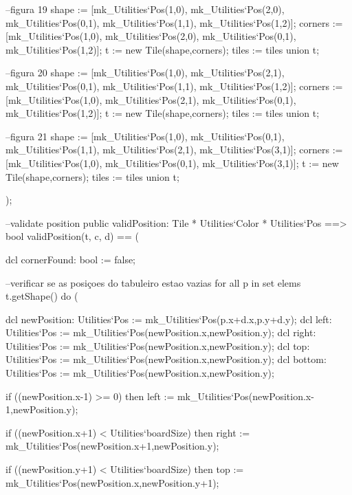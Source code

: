 \begin{vdm_al}
          --figura 19
          shape := [mk_Utilities`Pos(1,0), mk_Utilities`Pos(2,0), mk_Utilities`Pos(0,1),
       mk_Utilities`Pos(1,1), mk_Utilities`Pos(1,2)];
          corners := [mk_Utilities`Pos(1,0), mk_Utilities`Pos(2,0), mk_Utilities`Pos(0,1),
       mk_Utilities`Pos(1,2)];
          t := new Tile(shape,corners); 
          tiles := tiles union {t};
          
          --figura 20
          shape := [mk_Utilities`Pos(1,0), mk_Utilities`Pos(2,1), mk_Utilities`Pos(0,1),
       mk_Utilities`Pos(1,1), mk_Utilities`Pos(1,2)];
          corners := [mk_Utilities`Pos(1,0), mk_Utilities`Pos(2,1), mk_Utilities`Pos(0,1),
       mk_Utilities`Pos(1,2)];
          t := new Tile(shape,corners); 
          tiles := tiles union {t};
          
          --figura 21
          shape := [mk_Utilities`Pos(1,0), mk_Utilities`Pos(0,1), mk_Utilities`Pos(1,1),
       mk_Utilities`Pos(2,1), mk_Utilities`Pos(3,1)];
          corners :=  [mk_Utilities`Pos(1,0), mk_Utilities`Pos(0,1), mk_Utilities`Pos(3,1)];
          t := new Tile(shape,corners); 
          tiles := tiles union {t};
          
         );
        
        --validate position
        public validPosition: Tile * Utilities`Color * Utilities`Pos ==> bool
         validPosition(t, c, d) == (
          
       dcl cornerFound: bool := false;
          
          --verificar se as posiçoes do tabuleiro estao vazias
          for all p in set elems t.getShape() do (

           dcl newPosition: Utilities`Pos := mk_Utilities`Pos(p.x+d.x,p.y+d.y);
           dcl left: Utilities`Pos := mk_Utilities`Pos(newPosition.x,newPosition.y);
           dcl right: Utilities`Pos := mk_Utilities`Pos(newPosition.x,newPosition.y);           
           dcl top: Utilities`Pos := mk_Utilities`Pos(newPosition.x,newPosition.y);
           dcl bottom: Utilities`Pos := mk_Utilities`Pos(newPosition.x,newPosition.y);
           
           if ((newPosition.x-1) >= 0) then
            left := mk_Utilities`Pos(newPosition.x-1,newPosition.y);
           
           if ((newPosition.x+1) < Utilities`boardSize) then 
            right := mk_Utilities`Pos(newPosition.x+1,newPosition.y);
            
           if ((newPosition.y+1) < Utilities`boardSize) then           
            top := mk_Utilities`Pos(newPosition.x,newPosition.y+1);
            

\end{vdm_al}
